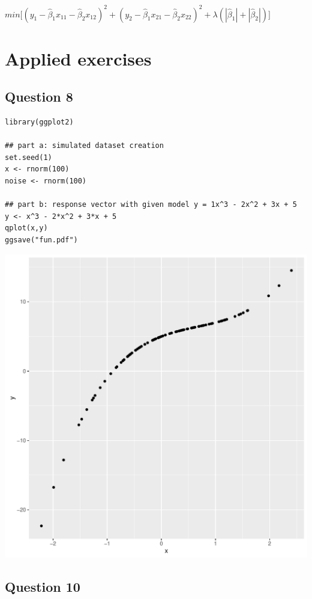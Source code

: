 \documentclass[11pt, a4paper]{article}
\begin{document}
$min\Big[ (y_1 - \hat{\beta}_1x_{11} - \hat{\beta}_2x_{12})^2 + (y_2 - \hat{\beta}_1x_{21} - \hat{\beta}_2x_{22})^2 + \lambda (|\hat{\beta}_1| + |\hat{\beta}_2|)\Big]$
\section{Applied exercises}
\label{sec-2}
\subsection{Question 8}
\label{sec-2-1}


\begin{verbatim}
library(ggplot2)

## part a: simulated dataset creation
set.seed(1)
x <- rnorm(100)
noise <- rnorm(100)

## part b: response vector with given model y = 1x^3 - 2x^2 + 3x + 5
y <- x^3 - 2*x^2 + 3*x + 5
qplot(x,y)
ggsave("fun.pdf")
\end{verbatim}

\includegraphics[scale=0.5]{fun.pdf}
\subsection{Question 10}
\label{sec-2-2}
\end{document}
